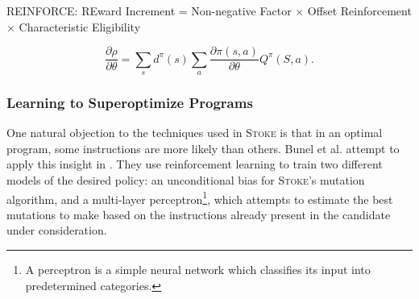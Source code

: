 \documentclass[12pt,twoside]{reedthesis}
\begin{document}



\textsc{REINFORCE}: REward Increment = Non-negative Factor $\times$ Offset Reinforcement $\times$ Characteristic Eligibility
\cite{sutton1999policygradient}

\[
    \frac{\partial \rho}{\partial \theta} = \sum_s d^\pi(s) \sum_a \frac{\partial \pi(s,a)}{\partial \theta}Q^\pi(S,a).
\]

\subsubsection{Learning to Superoptimize Programs}
One natural objection to the techniques used in \textsc{Stoke} is that in an optimal program, some instructions are more likely than others.
Bunel et al. attempt to apply this insight in \cite{bunel2017learning}.
They use reinforcement learning to train two different models of the desired policy:
    an unconditional bias for \textsc{Stoke}'s mutation algorithm,
    and a multi-layer perceptron\footnote{A perceptron is a simple neural network which classifies its input into predetermined categories.},
        which attempts to estimate the best mutations to make based on the instructions already present in the candidate under consideration.
\end{document}
